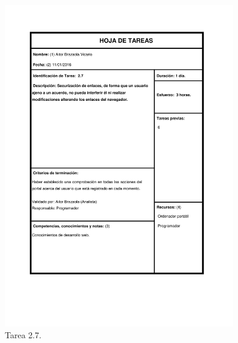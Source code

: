 \documentclass{DeustoFDP}
\begin{document}
\begin{figure}[H]
	\centering
	\includegraphics[width=0.9\textwidth]{fig/Tareas/27}
	\caption{Tarea 2.7.}
	\label{fig:t27}
\end{figure}
\end{document}
